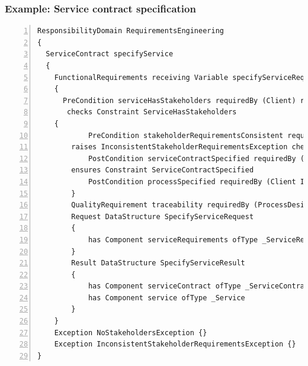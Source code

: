 \begin{frame}[fragile]
\frametitle{Example: Service contract specification}

\lstset{language=urdad,label=serviceTextSyntax}
\begin{lstlisting}[numbers=left,escapechar=|]
ResponsibilityDomain RequirementsEngineering
{
  ServiceContract specifyService
  {
    FunctionalRequirements receiving Variable specifyServiceRequest ofType SpecifyServiceRequest
    {
      PreCondition serviceHasStakeholders requiredBy (Client) raises NoStakeholdersException 
       checks Constraint ServiceHasStakeholders
	{
            PreCondition stakeholderRequirementsConsistent requiredBy (Client Implementation Testing) 
		raises InconsistentStakeholderRequirementsException checks Constraint RequirementsConsistent
            PostCondition serviceContractSpecified requiredBy (Client Implementation Testing) 
		ensures Constraint ServiceContractSpecified
            PostCondition processSpecified requiredBy (Client Implementation) ensures Constraint ProcessSpecified
        }
        QualityRequirement traceability requiredBy (ProcessDesign ProjectManagement Development)
        Request DataStructure SpecifyServiceRequest
        {
            has Component serviceRequirements ofType _ServiceRequirements
        }
        Result DataStructure SpecifyServiceResult
        {
            has Component serviceContract ofType _ServiceContract
            has Component service ofType _Service
        }
    }
    Exception NoStakeholdersException {}
    Exception InconsistentStakeholderRequirementsException {}
}
\end{lstlisting}
\end{frame}


